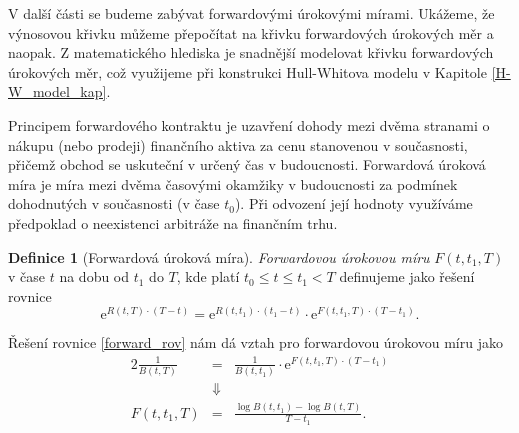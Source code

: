 \documentclass[a4paper,12pt]{report}
\theoremstyle{definition} \newtheorem{definice}[veta]{Definice}
\theoremstyle{remark}
\begin{document}
V další části se budeme zabývat forwardovými úrokovými mírami.
Ukážeme, že výnosovou křivku můžeme přepočítat na křivku forwardových úrokových měr a naopak. 
Z matematického hlediska je snadnější modelovat křivku forwardových úrokových měr, což využijeme při konstrukci Hull-Whitova modelu v Kapitole \ref{H-W_model_kap}.

Principem forwardového kontraktu je uzavření dohody mezi dvěma stranami o nákupu (nebo prodeji) finančního aktiva za cenu stanovenou v současnosti, přičemž obchod se uskuteční v určený čas v budoucnosti. 
Forwardová úroková míra je míra mezi dvěma časovými okamžiky v budoucnosti za podmínek dohodnutých v současnosti (v čase $t_0$).
Při odvození její hodnoty využíváme předpoklad o neexistenci arbitráže na finančním trhu. 
\begin{definice}[Forwardová úroková míra]\label{forward_def}
\textit{Forwardovou úrokovou míru} \linebreak 
$F(t,t_1,T)$ v čase $t$ na dobu od $t_1$ do $T$, kde platí $t_0\leq t\leq t_1<T$ definujeme jako řešení rovnice
\begin{equation}\label{forward_rov}
\mathrm{e}^{R(t,T)\cdot(T-t)}=\mathrm{e}^{R(t,t_1)\cdot(t_1-t)}\cdot\mathrm{e}^{F(t,t_1,T)\cdot(T-t_1)}.
\end{equation} 
\end{definice}
Řešení rovnice \eqref{forward_rov} nám dá vztah pro forwardovou úrokovou míru jako
\begin{alignat*}{2}
\frac{1}{ B(t,T)}&=&\frac{1}{B(t,t_1)}\cdot\mathrm{e}^{F(t,t_1,T)\cdot(T-t_1)}\\
&\Downarrow&\\
F(t,t_1,T)&=&\frac{\log B(t,t_1)-\log B(t,T)}{T-t_1}.
\end{alignat*}
\end{document}
